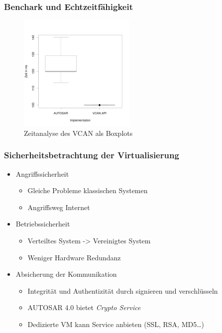 \documentclass[]{beamer}
\begin{document}
\begin{frame}
\frametitle{Benchark und Echtzeitfähigkeit}
    \begin{figure}
        \centering
        \includegraphics[width=0.5\textwidth]{boxplot}
        \caption[Zeitanalyse des VCAN als Boxplots]{Zeitanalyse des VCAN als Boxplots}
        \label{fig:timinganalyse}
    \end{figure}
\end{frame}

\begin{frame}
\frametitle{Sicherheitsbetrachtung der Virtualisierung}
    \begin{itemize}
        \item Angriffssicherheit
        \begin{itemize}
            \item Gleiche Probleme klassischen Systemen
            \item Angriffsweg Internet
        \end{itemize}
        \pause
        \item Betriebssicherheit
        \begin{itemize}
            \item Verteiltes System -> Vereinigtes System
            \item Weniger Hardware Redundanz
        \end{itemize}
        \pause
        \item Absicherung der Kommunikation
        \begin{itemize}
            \item Integrität und Authentizität durch signieren und verschlüsseln
            \item AUTOSAR 4.0 bietet \emph{Crypto Service}
            \item Dedizierte VM kann Service anbieten (SSL, RSA, MD5\dots)
        \end{itemize}
    \end{itemize}
\end{frame}
\end{document}
